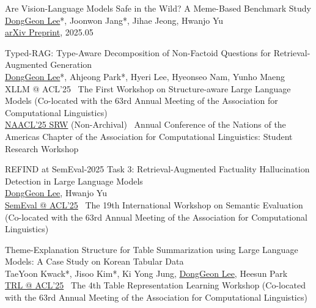 \documentclass[11pt,a4paper]{article}
\newcounter{pubnum}
\newenvironment{publications}
{\begin{list}{}
    {\setlength{\leftmargin}{1.35in}
     \setlength{\itemsep}{0.5em}
     \setlength{\labelsep}{0em}
     \renewcommand{\makelabel}[1]{##1}}}
{\end{list}}
\newcommand{\pubitem}[1]{%
    \addtocounter{pubnum}{-1}%
    \item[\textup{[\arabic{pubnum}]}] #1%
}
\begin{document}
\begin{publications}


\pubitem{
    Are Vision-Language Models Safe in the Wild? A Meme-Based Benchmark Study\\
        \underline{DongGeon Lee}*, Joonwon Jang*, Jihae Jeong,  Hwanjo Yu \\[3pt]
        \href{https://arxiv.org/abs/2505.15389v1}{arXiv Preprint}, 2025.05
}

\pubitem{
    Typed-RAG: Type-Aware Decomposition of Non-Factoid Questions for Retrieval-Augmented Generation \\
        \underline{DongGeon Lee}*, Ahjeong Park*, Hyeri Lee, Hyeonseo Nam, Yunho Maeng \\[3pt]
        XLLM @ ACL'25 \textbar\ The First Workshop on Structure-aware Large Language Models (Co-located with the 63rd Annual Meeting of the Association for Computational Linguistics) \\[1.5pt]
        \href{https://arxiv.org/abs/2503.15879}{NAACL'25 SRW} (Non-Archival) \textbar\ Annual Conference of the Nations of the Americas Chapter of the Association for Computational Linguistics: Student Research Workshop
        
}


\pubitem{
    REFIND at SemEval-2025 Task 3: Retrieval-Augmented Factuality Hallucination Detection in Large Language Models\\
        \underline{DongGeon Lee}, Hwanjo Yu \\[3pt]
        \href{https://arxiv.org/abs/2502.13622}{SemEval @ ACL'25} \textbar\ The 19th International Workshop on Semantic Evaluation (Co-located with the 63rd Annual Meeting of the Association for Computational Linguistics)
}

\pubitem{
    Theme-Explanation Structure for Table Summarization using Large Language Models: A Case Study on Korean Tabular Data \\
        TaeYoon Kwack*, Jisoo Kim*, Ki Yong Jung, \underline{DongGeon Lee}, Heesun Park  \\[3pt]
        \href{https://openreview.net/forum?id=Xwpn1unH8F}{TRL @ ACL'25} \textbar\ The 4th Table Representation Learning Workshop (Co-located with the 63rd Annual Meeting of the Association for Computational Linguistics)
}



\end{publications}
\end{document}
